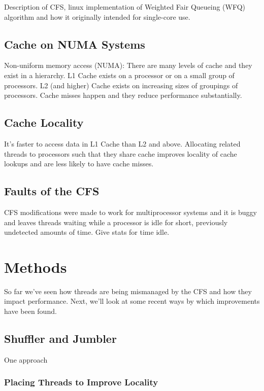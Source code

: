 \documentclass{sig-alternate}
\begin{document}
Description of CFS, linux implementation of Weighted Fair Queueing (WFQ) algorithm and how it originally intended for single-core use. \cite{Lozi:2016}

\subsection{Cache on NUMA Systems}
\label{sec:cache}

Non-uniform memory access (NUMA):
There are many levels of cache and they exist in a hierarchy. L1 Cache exists on a processor or on a small group of processors. L2 (and higher) Cache exists on increasing sizes of groupings of processors.
Cache misses happen and they reduce performance substantially.

\subsection{Cache Locality}
\label{sec:cachelocality}

It's faster to access data in L1 Cache than L2 and above. Allocating related threads to processors such that they share cache improves locality of cache lookups and are less likely to have cache misses.

\subsection{Faults of the CFS}
\label{sec:cfsfaults}

CFS modifications were made to work for multiprocessor systems and it is buggy and leaves threads waiting while a processor is idle for short, previously undetected amounts of time. Give stats for time idle.\cite{Lozi:2016}

\section{Methods}
\label{sec:methods}

So far we've seen how threads are being mismanaged by the CFS and how they impact performance. Next, we'll look at some recent ways by which improvements have been found.

\subsection{Shuffler and Jumbler}
\label{sec:sj}

One approach 

\subsubsection{Placing Threads to Improve Locality}
\label{sec:threadlocality}
\end{document}
